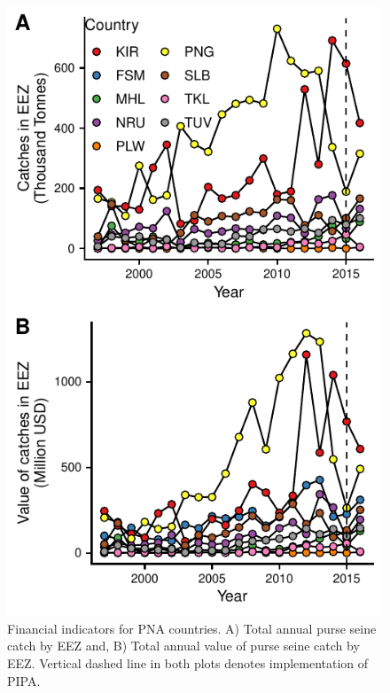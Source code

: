\documentclass[12pt]{article}
\begin{document}
\begin{figure}
\centering
	\includegraphics{img/catches.pdf}
	\caption{\label{fig:catches}Financial indicators for PNA countries. A) Total annual purse seine catch by EEZ and, B) Total annual value of purse seine catch by EEZ. Vertical dashed line in both plots denotes implementation of PIPA.}
\end{figure}
\end{document}

